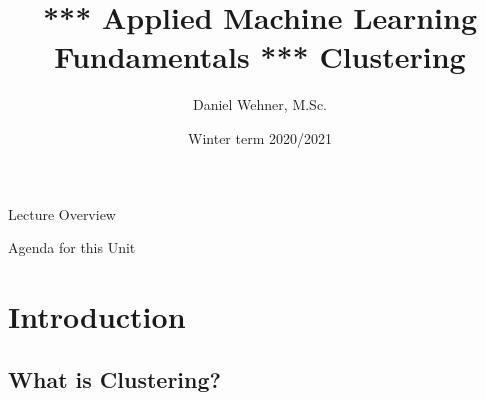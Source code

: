 


\title[Clustering]{*** Applied Machine Learning Fundamentals *** Clustering}
\author{Daniel Wehner, M.Sc.}
\date{Winter term 2020/2021}




\maketitlepage


\begin{frame}{Lecture Overview}{}
\end{frame}


\begin{frame}{Agenda for this Unit}
	\begin{multicols}{2}
		\tableofcontents
	\end{multicols}
\end{frame}


\section{Introduction}

\subsection{What is Clustering?}

